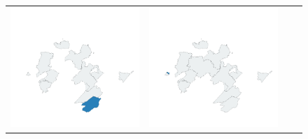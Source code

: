 \begin{figure}[p]
\begin{tabularx}{1\textwidth}{XXXX}
\includegraphics[width=1\linewidth]{images/ch6/loading/07}&
\includegraphics[width=1\linewidth]{images/ch6/loading/08} \\

\end{tabularx}
\end{figure}
